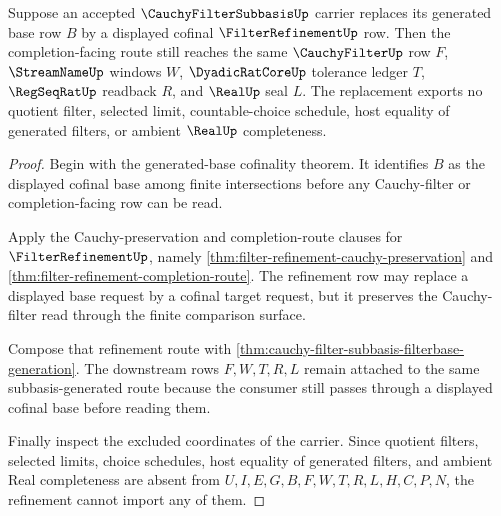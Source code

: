 \begin{theorem}
\label{thm:cauchy-filter-subbasis-filter-refinement-stability}
Suppose an accepted $\CauchyFilterSubbasisUp$ carrier replaces its generated base row $B$ by a displayed cofinal $\FilterRefinementUp$ row. Then the completion-facing route still reaches the same $\CauchyFilterUp$ row $F$, $\StreamNameUp$ windows $W$, $\DyadicRatCoreUp$ tolerance ledger $T$, $\RegSeqRatUp$ readback $R$, and $\RealUp$ seal $L$. The replacement exports no quotient filter, selected limit, countable-choice schedule, host equality of generated filters, or ambient $\RealUp$ completeness.
\end{theorem}
\begin{proof}
Begin with the generated-base cofinality theorem. It identifies $B$ as the displayed cofinal base among finite intersections before any Cauchy-filter or completion-facing row can be read.

Apply the Cauchy-preservation and completion-route clauses for $\FilterRefinementUp$, namely \autoref{thm:filter-refinement-cauchy-preservation} and \autoref{thm:filter-refinement-completion-route}. The refinement row may replace a displayed base request by a cofinal target request, but it preserves the Cauchy-filter read through the finite comparison surface.

Compose that refinement route with \autoref{thm:cauchy-filter-subbasis-filterbase-generation}. The downstream rows $F,W,T,R,L$ remain attached to the same subbasis-generated route because the consumer still passes through a displayed cofinal base before reading them.

Finally inspect the excluded coordinates of the carrier. Since quotient filters, selected limits, choice schedules, host equality of generated filters, and ambient Real completeness are absent from $U,I,E,G,B,F,W,T,R,L,H,C,P,N$, the refinement cannot import any of them.
\end{proof}


